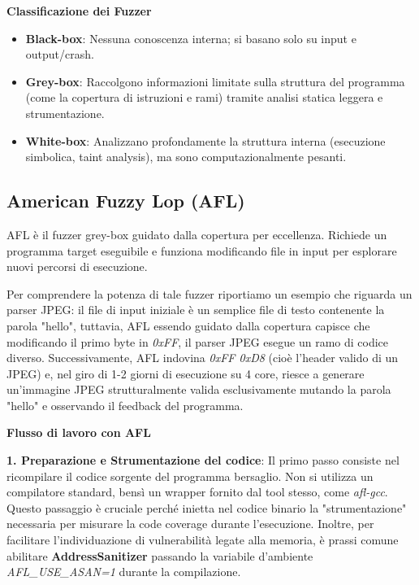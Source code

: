 \textbf{Classificazione dei Fuzzer}

\begin{itemize}
    \item \textbf{Black-box}: Nessuna conoscenza interna; si basano solo su input e output/crash.
    \item \textbf{Grey-box}: Raccolgono informazioni limitate sulla struttura del programma (come la copertura di istruzioni e rami) tramite analisi statica leggera e strumentazione.
    \item \textbf{White-box}: Analizzano profondamente la struttura interna (esecuzione simbolica, taint analysis), ma sono computazionalmente pesanti.
\end{itemize}

\subsection{American Fuzzy Lop (AFL)}

AFL è il fuzzer grey-box guidato dalla copertura per eccellenza. Richiede un 
programma target eseguibile e funziona modificando file in input per esplorare nuovi 
percorsi di esecuzione.

Per comprendere la potenza di tale fuzzer riportiamo un esempio che riguarda un parser JPEG:
il file di input iniziale è un semplice file di testo contenente la parola "hello", tuttavia,
AFL essendo guidato dalla copertura capisce che modificando il primo byte in \textit{0xFF}, il 
parser JPEG esegue un ramo di codice diverso. Successivamente, AFL indovina \textit{0xFF 0xD8}
(cioè l'header valido di un JPEG) e, nel giro di 1-2 giorni di esecuzione su 4 core,
riesce a generare un'immagine JPEG strutturalmente valida esclusivamente mutando la 
parola "hello" e osservando il feedback del programma.

\textbf{Flusso di lavoro con AFL}

\textbf{1. Preparazione e Strumentazione del codice}: Il primo passo consiste nel 
ricompilare il codice sorgente del programma bersaglio. Non si utilizza un 
compilatore standard, bensì un wrapper fornito dal tool stesso, come \textit{afl-gcc}. 
Questo passaggio è cruciale perché inietta nel codice binario la "strumentazione" 
necessaria per misurare la code coverage durante l'esecuzione. Inoltre, per 
facilitare l'individuazione di vulnerabilità legate alla memoria, è prassi comune 
abilitare \textbf{AddressSanitizer} passando la variabile d'ambiente \textit{AFL\_USE\_ASAN=1} 
durante la compilazione.

